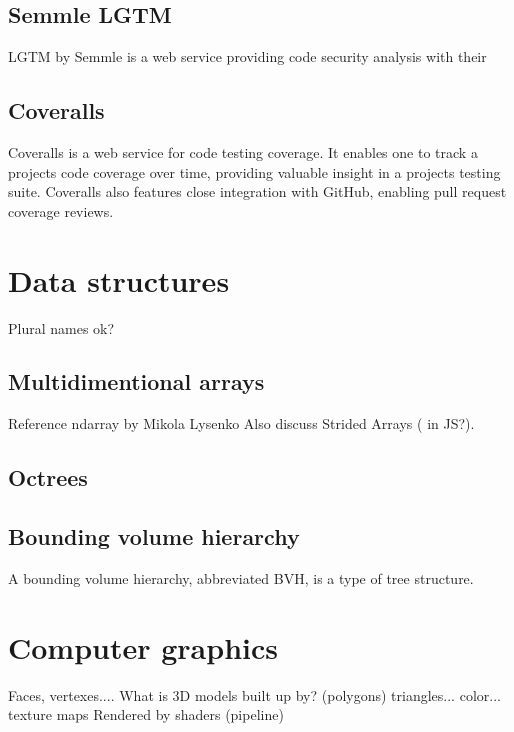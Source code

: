 \subsection{Semmle LGTM}
LGTM by Semmle is a web service providing code security analysis with their 

\subsection{Coveralls}
Coveralls \cite{coveralls} is a web service for code testing coverage. It enables one to track a projects code coverage over time, providing valuable insight in a projects testing suite. Coveralls also features close integration with GitHub, enabling pull request coverage reviews.

\section{Data structures}
Plural names ok?

\subsection{Multidimentional arrays}
Reference ndarray by Mikola Lysenko
Also discuss Strided Arrays ( in JS?).

\subsection{Octrees}

\subsection{Bounding volume hierarchy }
A bounding volume hierarchy, abbreviated BVH, is a type of tree structure.

\section{Computer graphics}


Faces, vertexes.... What is 3D models built up by? (polygons) triangles... color...
texture maps
Rendered by shaders (pipeline)

